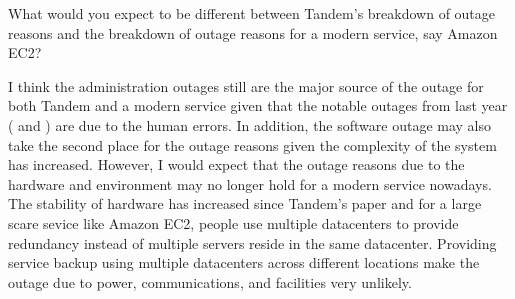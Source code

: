 \begin{QandA}
   \item What would you expect to be different between Tandem's breakdown of outage reasons and the breakdown of outage reasons for a modern service, say Amazon EC2?
         \begin{answered}
         I think the administration outages still are the major source of the outage for both Tandem and a modern service given that 
         the notable outages from last year ( and ) are due to the human errors. In addition, the software outage may also take the second
         place for the outage reasons given the complexity of the system has increased. However, I would expect that the outage reasons due to the
         hardware and environment may no longer hold for a modern service nowadays. The stability of hardware has increased since Tandem's paper
         and for a large scare sevice like Amazon EC2, people use multiple datacenters to provide redundancy instead of multiple servers reside in
         the same datacenter. Providing service backup using multiple datacenters across different locations make the outage due to power, communications, and facilities very unlikely.
         \end{answered}
\end{QandA}

